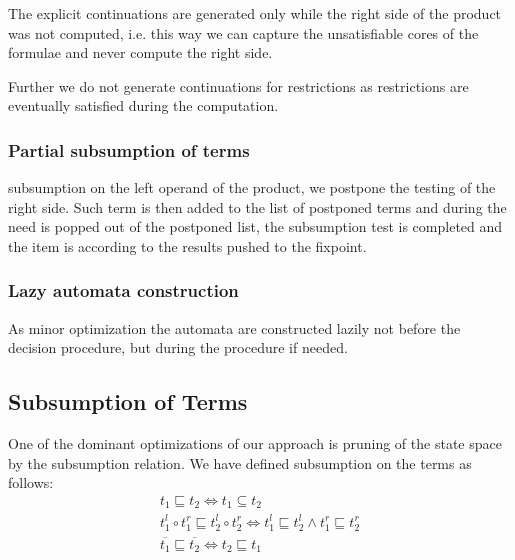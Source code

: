     The explicit continuations are generated only while the right
    side of the product was not computed, i.e. this way we can
    capture the unsatisfiable cores of the formulae and never 
    compute the right side. 
    
    Further we do not generate continuations for restrictions as
    restrictions are eventually satisfied during the computation.
  
    \subsubsection{Partial subsumption of terms}\label{opt:partial-sub}
    
    subsumption on the left operand of the product, we postpone the
    testing of the right side. Such term is then added to the list
    of postponed terms and during the need is popped out of the
    postponed list, the subsumption test is completed and the
    item is according to the results pushed to the fixpoint.
    
    \subsubsection{Lazy automata construction}
    As minor optimization the automata are constructed lazily 
    not before the decision procedure, but during the procedure
    if needed.
    
  \subsection{Subsumption of Terms}\label{opt:sub}
  
  One of the dominant optimizations of our approach is pruning of the
  state space by the subsumption relation. We have defined 
  subsumption on the terms as follows:
  	\begin{eqnarray}
  	t_1 \sqsubseteq t_2 \Leftrightarrow t_1 \subseteq t_2 \\
  	t_1^l \circ t_1^r \sqsubseteq t_2^l \circ t_2^r 
  	  \Leftrightarrow t_1^l \sqsubseteq t_2^l \wedge
  	                  t_1^r \sqsubseteq t_2^r\\
    \overline{t_1} \sqsubseteq \overline{t_2} \Leftrightarrow
      t_2 \sqsubseteq t_1
	\end{eqnarray}  	  
  
